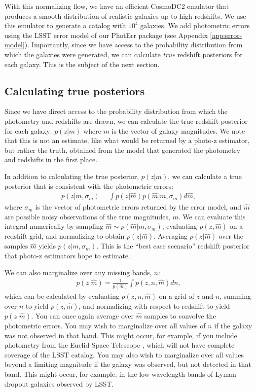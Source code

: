 \documentclass[twocolumn,twocolappendix]{aastex631}
\begin{document}
With this normalizing flow, we have an efficient CosmoDC2 emulator that produces a smooth distribution of realistic galaxies up to high-redshifts.
We use this emulator to generate a catalog with $10^4$ galaxies.
We add photometric errors using the LSST error model of our PhotErr package (see Appendix \ref{app:error-model}).
Importantly, since we have access to the probability distribution from which the galaxies were generated, we can calculate \emph{true} redshift posteriors for each galaxy.
This is the subject of the next section.

\subsection{Calculating true posteriors}
\label{sec:true-posteriors}

Since we have direct access to the probability distribution from which the photometry and redshifts are drawn, we can calculate the true redshift posterior for each galaxy: $p(z|m)$ where $m$ is the vector of galaxy magnitudes.
We note that this is not an estimate, like what would be returned by a photo-z estimator, but rather the truth, obtained from the model that generated the photometry and redshifts in the first place.

In addition to calculating the true posterior, $p(z|m)$, we can calculate a true posterior that is consistent with the photometric errors:
\begin{align}
    p(z|m, \sigma_m) = \int p(z|\hat{m}) p(\hat{m}|m, \sigma_m) d\hat{m},
    \label{eq:err-conv}
\end{align}
where $\sigma_m$ is the vector of photometric errors returned by the error model, and $\hat{m}$ are possible noisy observations of the true magnitudes, $m$.
We can evaluate this integral numerically by sampling $\hat{m} \sim p(\hat{m}|m, \sigma_m)$, evaluating $p(z, \hat{m})$ on a redshift grid, and normalizing to obtain $p(z|\hat{m})$.
Averaging $p(z|\hat{m})$ over the samples $\hat{m}$ yields $p(z|m, \sigma_m)$.
This is the ``best case scenario'' redshift posterior that photo-z estimators hope to estimate.

We can also marginalize over any missing bands, $n$:
\begin{align}
    p(z|\hat{m}) = \frac{1}{p(\hat{m})} \int p(z, n, \hat{m}) dn,
\end{align}
which can be calculated by evaluating $p(z, n, \hat{m})$ on a grid of $z$ and $n$, summing over $n$ to yield $p(z, \hat{m})$, and normalizing with respect to redshift to yield $p(z|\hat{m})$.
You can once again average over $\hat{m}$ samples to convolve the photometric errors.
You may wish to marginalize over all values of $n$ if the galaxy was not observed in that band.
This might occur, for example, if you include photometry from the Euclid Space Telescope \citep{euclid}, which will not have complete coverage of the LSST catalog.
You may also wish to marginalize over all values beyond a limiting magnitude if the galaxy was observed, but not detected in that band.
This might occur, for example, in the low wavelength bands of Lyman dropout galaxies observed by LSST.
\end{document}
